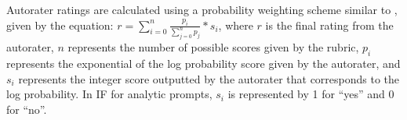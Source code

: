 
Autorater ratings are calculated using a probability weighting scheme similar to \citet{huynh2023understanding}, given by the equation: $r = \sum_{i=0}^{n}\frac{{p_i}}{\sum_{j=0}^{n} {p_j}} *s_i$, where $r$ is the final rating from the autorater, $n$ represents the number of possible scores given by the rubric, $p_i$ represents the exponential of the log probability score given by the autorater, and $s_i$ represents the integer score outputted by the autorater that corresponds to the log probability. In IF for analytic prompts, $s_i$ is represented by 1 for ``yes'' and 0 for ``no''.

